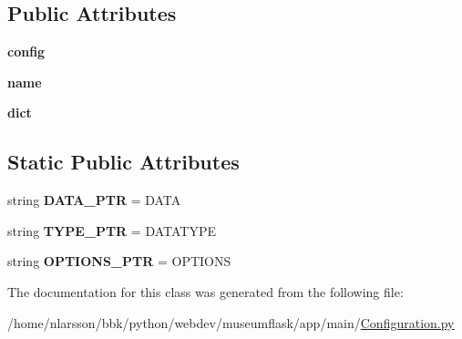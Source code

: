 \subsection*{Public Attributes}
\begin{DoxyCompactItemize}
\item 
\mbox{\label{classapp_1_1main_1_1Configuration_1_1Configuration_a3b90253c8b5b66e2060b563cbc60a057}} 
{\bfseries config}
\item 
\mbox{\label{classapp_1_1main_1_1Configuration_1_1Configuration_a2b24039b120353f6566b42bdc4d57d43}} 
{\bfseries name}
\item 
\mbox{\label{classapp_1_1main_1_1Configuration_1_1Configuration_ab3093a6a604a575dd05b49eb067be029}} 
{\bfseries dict}
\end{DoxyCompactItemize}
\subsection*{Static Public Attributes}
\begin{DoxyCompactItemize}
\item 
\mbox{\label{classapp_1_1main_1_1Configuration_1_1Configuration_a18ad426c4d3dba204c19dc70e94a5566}} 
string {\bfseries D\+A\+T\+A\+\_\+\+P\+TR} = \textquotesingle{}D\+A\+TA\textquotesingle{}
\item 
\mbox{\label{classapp_1_1main_1_1Configuration_1_1Configuration_a7b2b4dfd578c07ae14e3d5a30f66371a}} 
string {\bfseries T\+Y\+P\+E\+\_\+\+P\+TR} = \textquotesingle{}D\+A\+T\+A\+T\+Y\+PE\textquotesingle{}
\item 
\mbox{\label{classapp_1_1main_1_1Configuration_1_1Configuration_a9d35d0bdf2a22fdf4cbf009b593a5699}} 
string {\bfseries O\+P\+T\+I\+O\+N\+S\+\_\+\+P\+TR} = \textquotesingle{}O\+P\+T\+I\+O\+NS\textquotesingle{}
\end{DoxyCompactItemize}


The documentation for this class was generated from the following file\+:\begin{DoxyCompactItemize}
\item 
/home/nlarsson/bbk/python/webdev/museumflask/app/main/\mbox{\hyperlink{Configuration_8py}{Configuration.\+py}}\end{DoxyCompactItemize}
